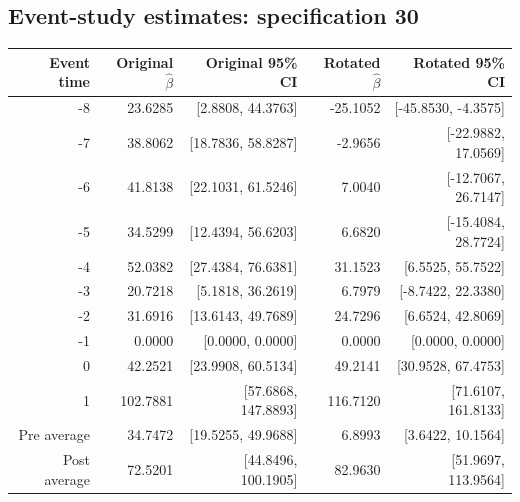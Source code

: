 \documentclass[10pt]{article}
\begin{document}
\subsection*{Event-study estimates: specification 30}
\begin{center}\scriptsize
\begin{tabular}{r rr rr}
\toprule
Event time & Original $\hat\beta$ & Original 95\% CI & Rotated $\hat\beta$ & Rotated 95\% CI \\
\midrule
-8 & 23.6285 & [2.8808, 44.3763] & -25.1052 & [-45.8530, -4.3575] \\
-7 & 38.8062 & [18.7836, 58.8287] & -2.9656 & [-22.9882, 17.0569] \\
-6 & 41.8138 & [22.1031, 61.5246] & 7.0040 & [-12.7067, 26.7147] \\
-5 & 34.5299 & [12.4394, 56.6203] & 6.6820 & [-15.4084, 28.7724] \\
-4 & 52.0382 & [27.4384, 76.6381] & 31.1523 & [6.5525, 55.7522] \\
-3 & 20.7218 & [5.1818, 36.2619] & 6.7979 & [-8.7422, 22.3380] \\
-2 & 31.6916 & [13.6143, 49.7689] & 24.7296 & [6.6524, 42.8069] \\
-1 & 0.0000 & [0.0000, 0.0000] & 0.0000 & [0.0000, 0.0000] \\
0 & 42.2521 & [23.9908, 60.5134] & 49.2141 & [30.9528, 67.4753] \\
1 & 102.7881 & [57.6868, 147.8893] & 116.7120 & [71.6107, 161.8133] \\
\midrule
Pre average & 34.7472 & [19.5255, 49.9688] & 6.8993 & [3.6422, 10.1564] \\
Post average & 72.5201 & [44.8496, 100.1905] & 82.9630 & [51.9697, 113.9564] \\
\bottomrule
\end{tabular}
\end{center}
\clearpage
\end{document}
